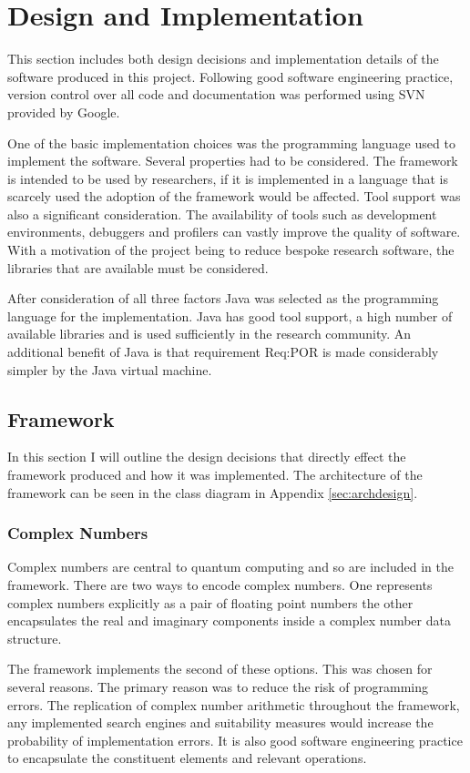 \chapter{Design and Implementation}
\label{sec:desandimp}
\lstset{language=Java}
This section includes both design decisions and implementation details of the software produced in this project.
Following good software engineering practice, version control over all code and documentation was performed using SVN provided by Google\cite{googproj}.

One of the basic implementation choices was the programming language used to implement the software.
Several properties had to be considered.
The framework is intended to be used by researchers, if it is implemented in a language that is scarcely used the adoption of the framework would be affected.
Tool support was also a significant consideration.
The availability of tools such as development environments, debuggers and profilers can vastly improve the quality of software.
With a motivation of the project being to reduce bespoke research software, the libraries that are available must be considered.

After consideration of all three factors Java was selected as the programming language for the implementation.
Java has good tool support, a high number of available libraries and is used sufficiently in the research community.
An additional benefit of Java is that requirement Req:POR is made considerably simpler by the Java virtual machine.

\section{Framework}
In this section I will outline the design decisions that directly effect the framework produced and how it was implemented.
The architecture of the framework can be seen in the class diagram in Appendix \ref{sec:archdesign}.

\subsection{Complex Numbers}
Complex numbers are central to quantum computing and so are included in the framework.
There are two ways to encode complex numbers.
One represents complex numbers explicitly as a pair of floating point numbers the other encapsulates the real and imaginary components inside a complex number data structure.

The framework implements the second of these options.
This was chosen for several reasons.
The primary reason was to reduce the risk of programming errors.
The replication of complex number arithmetic throughout the framework, any implemented search engines and suitability measures would increase the probability of implementation errors.
It is also good software engineering practice to encapsulate the constituent elements and relevant operations.

